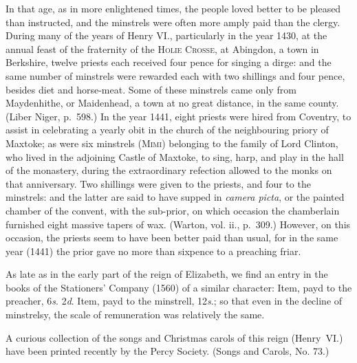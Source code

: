 In that age, as in more enlightened times, the people loved better to be pleased
than instructed, and the minstrels were often more amply paid than the clergy.
During many of the years of Henry VI., particularly in the year 1430, at the
annual feast of the fraternity of the \textsc{Holie Crosse}, at Abingdon, a town in
Berkshire, twelve priests each received four pence for singing a dirge: and the
same number of minstrels were rewarded each with two shillings and four pence,
besides diet and horse-meat. Some of these minstrels came only from Maydenhithe, 
or Maidenhead, a town at no great distance, in the same county. (Liber
Niger, p.~598.) In the year 1441, eight priests were hired from Coventry,
to assist in celebrating a yearly obit in the church \pagebreak 
of the neighbouring priory of 
Maxtoke; as were six minstrels (\textsc{Mimi}) belonging to the family of Lord Clinton,
who lived in the adjoining Castle of Maxtoke, to sing, harp, and play in the hall
of the monastery, during the extraordinary refection allowed to the monks on that
anniversary. Two shillings were given to the priests, and four to the minstrels:
and the latter are said to have supped in \textit{camera picta}, or the painted chamber of
the convent, with the sub-prior, on which occasion the chamberlain furnished
eight massive tapers of wax. (Warton, vol. ii., p.~309.) However, on this occasion,
the priests seem to have been better paid than usual, for in the same year
(1441) the prior gave no more than sixpence to a preaching friar.

\renewcommand\rectoheader{henry vi.}

As late as in the early part of the reign of Elizabeth, we find an entry in the
books of the Stationers’ Company (1560) of a similar character: Item, payd to
the preacher, 6\textit{s}. 2\textit{d}. Item, payd to the minstrell, 12\textit{s}.; so that even in the
decline of minstrelsy, the scale of remuneration was relatively the same.

A curious collection of the songs and Christmas carols of this reign (Henry~VI.) 
have been printed recently by the Percy Society. (Songs and Carols, No. 73.)

